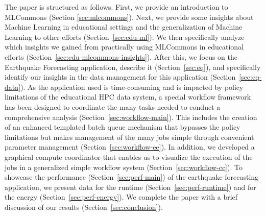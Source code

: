 \documentclass[utf8]{FrontiersinVancouver} %
\begin{document}
The paper is structured as follows. First, we provide an introduction to MLCommons (Section \ref{sec:mlcommons}).  Next, we provide some insights about Machine Learning in educational settings and the generalization of Machine Learning to other efforts (Section~\ref{sec:edu-ml}). We then specifically analyze which insights we gained from practically using MLCommons in educational efforts (Section~\ref{sec:edu-mlcommons-insights}). After this, we focus on the Earthquake Forecasting application, describe it (Section~\ref{sec:eq}), and specifically identify our insights in the data management for this application (Section~\ref{sec:eq-data}).  As the application used is time-consuming and is impacted by policy limitations of the educational HPC data system, a special workflow framework has been designed to coordinate the many tasks needed to conduct a comprehensive analysis (Section~\ref{sec:workflow-main}). This includes the creation of an enhanced templated batch queue mechanism that bypasses the policy limitations but makes management of the many jobs simple through convenient parameter management (Section~\ref{sec:workflow-ee}). In addition, we developed a graphical compute coordinator that enables us to visualize the execution of the jobs in a generalized simple workflow system (Section~\ref{sec:workflow-cc}).  To showcase the performance (Section~\ref{sec:perf-main}) of the earthquake forecasting application, we present data for the runtime (Section~\ref{sec:perf-runtime}) and for the energy (Section~\ref{sec:perf-energy}). We complete the paper with a brief discussion of our results (Section~\ref{sec:conclusion}).
\end{document}
